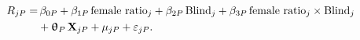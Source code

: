 \begin{equation}\label{equationC6b}
	\begin{split}
		R_{jP}=&\,\beta_{0P}+\beta_{1P}\,\text{female ratio}_j+\beta_{2P}\,\text{Blind}_j+\beta_{3P}\,\text{female ratio}_j\times\text{Blind}_j\\
			&+\bm\uptheta_P\,\mathbf{X}_{jP}+\mu_{jP}+\varepsilon_{jP}.
	\end{split}
\end{equation}